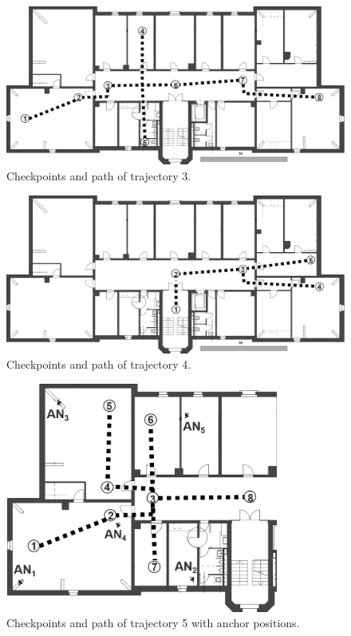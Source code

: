 \begin{figure}[th]
\centering
\includegraphics[width=1.0\textwidth]{Figures/trajectory3}
\decoRule
\caption[Trajectory 3]{Checkpoints and path of trajectory 3.}
\label{fig:trajectory3}
\end{figure}


\begin{figure}[th]
\centering
\includegraphics[width=1.0\textwidth]{Figures/trajectory4}
\decoRule
\caption[Trajectory 4]{Checkpoints and path of trajectory 4.}
\label{fig:trajectory4}
\end{figure}

\begin{figure}[th]
\centering
\includegraphics[width=0.8\textwidth]{Figures/trajectory5_withAnchors}
\decoRule
\caption[Trajectory 5]{Checkpoints and path of trajectory 5 with anchor positions.}
\label{fig:trajectory5_withAnchorsAppendix}
\end{figure}

